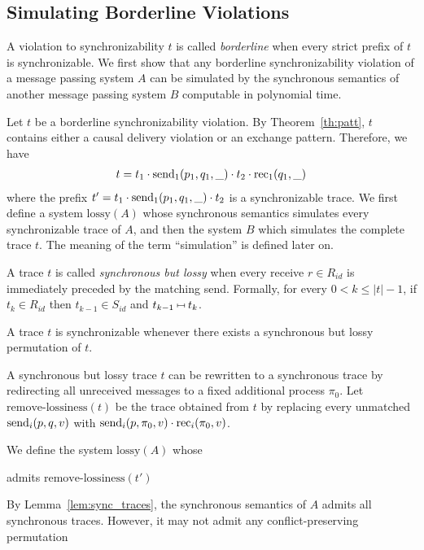 \subsection{Simulating Borderline Violations}

A violation to synchronizability $t$ is called \emph{borderline} when every strict prefix of $t$ is synchronizable.
We first show that any borderline synchronizability violation of a message passing system $A$ can be simulated by 
the synchronous semantics of another message passing system $B$ computable in polynomial time.

Let $t$ be a borderline synchronizability violation.
By Theorem~\ref{th:patt}, $t$ contains either a causal delivery violation or an exchange pattern.
Therefore, we have 
\begin{align*}
t=t_1\cdot \mathrm{send}_{1}({p_1,q_1,\_}) \cdot t_2\cdot \mathrm{rec}_{1}({q_1,\_})
\end{align*} 
where the prefix $t' = t_1\cdot \mathrm{send}_{1}({p_1,q_1,\_}) \cdot t_2$ is a synchronizable trace.
We first define a system $\mathrm{lossy}(A)$ whose synchronous semantics simulates every synchronizable 
trace of $A$, and then the system $B$ which simulates the complete trace $t$. The meaning of 
the term ``simulation'' is defined later on.

A trace $t$ is called \emph{synchronous but lossy} when every receive $r\in R_{id}$ is immediately 
preceded by the matching send. Formally, for every $0 < k\leq |t| -1$, if $t_k\in R_{id}$ then 
$t_{k-1}\in S_{id}$ and $t_{k-1}\match t_{k}$.

\begin{lemma}
A trace $t$ is synchronizable whenever there exists a synchronous but lossy permutation of $t$.
\end{lemma}

A synchronous but lossy trace $t$ can be rewritten to a synchronous trace by redirecting all unreceived messages 
to a fixed additional process $\pi_0$. Let $\mathrm{remove\text{-}lossiness}(t)$ be the trace obtained from $t$
by replacing every unmatched $\mathrm{send}_{i}({p,q,v})$ with $\mathrm{send}_{i}({p,\pi_0,v})\cdot \mathrm{rec}_{i}({\pi_0,v})$.

We define the system $\mathrm{lossy}(A)$ whose 

 admits $\mathrm{remove\text{-}lossiness}(t')$ 


By Lemma~\ref{lem:sync_traces}, the synchronous semantics of $A$ admits all synchronous traces. 
However, it may not admit any conflict-preserving permutation 


